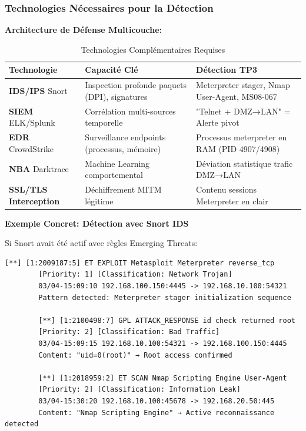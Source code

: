 \documentclass[12pt,a4paper,openany]{report}
\newcommand{\tableheadcolor}{\rowcolor{tableheadbg}}
\begin{document}
	\subsubsection{Technologies Nécessaires pour la Détection}
	
	\textbf{Architecture de Défense Multicouche:}
	
	\begin{table}[H]
		\centering
		\small
		\renewcommand{\arraystretch}{1.5}
		\setlength{\arrayrulewidth}{0.5pt}
		\begin{tabular}{p{3cm} p{5cm} p{5cm}}
			\arrayrulecolor{tableborder}
			\hline
			\tableheadcolor
			\textcolor{tableheadfg}{\textbf{Technologie}} &
			\textcolor{tableheadfg}{\textbf{Capacité Clé}} &
			\textcolor{tableheadfg}{\textbf{Détection TP3}} \\
			\hline
			\rowcolor{tablerowalt}
			\textbf{IDS/IPS} Snort & 
			Inspection profonde paquets (DPI), signatures & 
			Meterpreter stager, Nmap User-Agent, MS08-067 \\
			
			\textbf{SIEM} ELK/Splunk & 
			Corrélation multi-sources temporelle & 
			"Telnet + DMZ→LAN" = Alerte pivot \\
			
			\rowcolor{tablerowalt}
			\textbf{EDR} CrowdStrike & 
			Surveillance endpoints (processus, mémoire) & 
			Processus meterpreter en RAM (PID 4907/4908) \\
			
			\textbf{NBA} Darktrace & 
			Machine Learning comportemental & 
			Déviation statistique trafic DMZ→LAN \\
			
			\rowcolor{tablerowalt}
			\textbf{SSL/TLS Interception} & 
			Déchiffrement MITM légitime & 
			Contenu sessions Meterpreter en clair \\
			\hline
		\end{tabular}
		\caption{Technologies Complémentaires Requises}
	\end{table}
	
	\textbf{Exemple Concret: Détection avec Snort IDS}
	
	Si Snort avait été actif avec règles Emerging Threats:
	
	\begin{lstlisting}[style=logstyle,caption=Alertes Snort (Simulation Basée sur Signatures Réelles)]
		[**] [1:2009187:5] ET EXPLOIT Metasploit Meterpreter reverse_tcp
		[Priority: 1] [Classification: Network Trojan]
		03/04-15:09:10 192.168.100.150:4445 -> 192.168.10.100:54321
		Pattern detected: Meterpreter stager initialization sequence
		
		[**] [1:2100498:7] GPL ATTACK_RESPONSE id check returned root
		[Priority: 2] [Classification: Bad Traffic]
		03/04-15:09:15 192.168.10.100:54321 -> 192.168.100.150:4445
		Content: "uid=0(root)" → Root access confirmed
		
		[**] [1:2018959:2] ET SCAN Nmap Scripting Engine User-Agent
		[Priority: 2] [Classification: Information Leak]
		03/04-15:30:20 192.168.10.100:45678 -> 192.168.20.50:445
		Content: "Nmap Scripting Engine" → Active reconnaissance detected
	\end{lstlisting}
	
\end{document}
